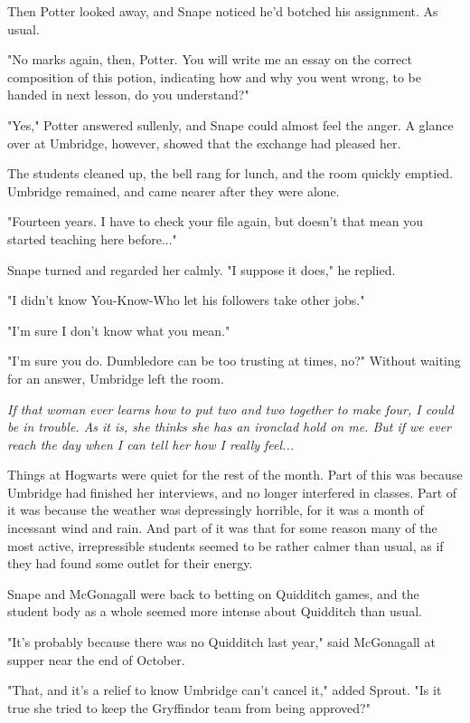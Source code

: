 \documentclass[a4paper,11pt]{article}
\begin{document}
Then Potter looked away, and Snape noticed he'd botched his assignment. As usual.

"No marks again, then, Potter. You will write me an essay on the correct composition of this potion, indicating how and why you went wrong, to be handed in next lesson, do you understand?"

"Yes," Potter answered sullenly, and Snape could almost feel the anger. A glance over at Umbridge, however, showed that the exchange had pleased her.

The students cleaned up, the bell rang for lunch, and the room quickly emptied. Umbridge remained, and came nearer after they were alone.

"Fourteen years. I have to check your file again, but doesn't that mean you started teaching here before..."

Snape turned and regarded her calmly. "I suppose it does," he replied.

"I didn't know You-Know-Who let his followers take other jobs."

"I'm sure I don't know what you mean."

"I'm sure you do. Dumbledore can be too trusting at times, no?" Without waiting for an answer, Umbridge left the room.

\emph{If that woman ever learns how to put two and two together to make four, I could be in trouble. As it is, she thinks she has an ironclad hold on me. But if we ever reach the day when I can tell her how I really feel...}

Things at Hogwarts were quiet for the rest of the month. Part of this was because Umbridge had finished her interviews, and no longer interfered in classes. Part of it was because the weather was depressingly horrible, for it was a month of incessant wind and rain. And part of it was that for some reason many of the most active, irrepressible students seemed to be rather calmer than usual, as if they had found some outlet for their energy.

Snape and McGonagall were back to betting on Quidditch games, and the student body as a whole seemed more intense about Quidditch than usual.

"It's probably because there was no Quidditch last year," said McGonagall at supper near the end of October.

"That, and it's a relief to know Umbridge can't cancel it," added Sprout. "Is it true she tried to keep the Gryffindor team from being approved?"
\end{document}
